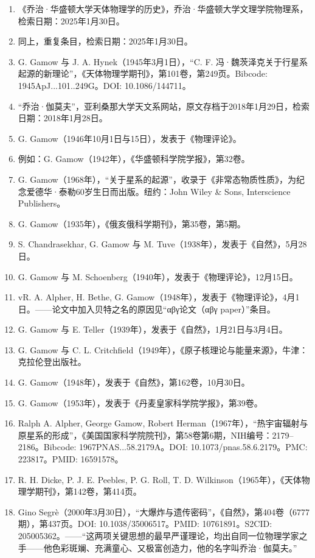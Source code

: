 \begin{enumerate}
\item 《乔治·华盛顿大学天体物理学的历史》，乔治·华盛顿大学文理学院物理系，检索日期：2025年1月30日。
\item 同上，重复条目，检索日期：2025年1月30日。
\item G. Gamow 与 J. A. Hynek（1945年3月1日），“C. F. 冯·魏茨泽克关于行星系起源的新理论”，《天体物理学期刊》，第101卷，第249页。Bibcode: 1945ApJ...101..249G。DOI: 10.1086/144711。
\item “乔治·伽莫夫”，亚利桑那大学天文系网站，原文存档于2018年1月29日，检索日期：2018年1月28日。
\item G. Gamow（1946年10月1日与15日），发表于《物理评论》。
\item 例如：G. Gamow（1942年），《华盛顿科学院学报》，第32卷。
\item G. Gamow（1968年），“关于星系的起源”，收录于《非常态物质性质》，为纪念爱德华·泰勒60岁生日而出版。纽约：John Wiley & Sons, Interscience Publishers。
\item G. Gamow（1935年），《俄亥俄科学期刊》，第35卷，第5期。
\item S. Chandrasekhar, G. Gamow 与 M. Tuve（1938年），发表于《自然》，5月28日。
\item G. Gamow 与 M. Schoenberg（1940年），发表于《物理评论》，12月15日。
\item vR. A. Alpher, H. Bethe, G. Gamow（1948年），发表于《物理评论》，4月1日。——论文中加入贝特之名的原因见“αβγ论文（αβγ paper）”条目。
\item G. Gamow 与 E. Teller（1939年），发表于《自然》，1月21日与3月4日。
\item G. Gamow 与 C. L. Critchfield（1949年），《原子核理论与能量来源》，牛津：克拉伦登出版社。
\item G. Gamow（1948年），发表于《自然》，第162卷，10月30日。
\item G. Gamow（1953年），发表于《丹麦皇家科学院学报》，第39卷。
\item Ralph A. Alpher, George Gamow, Robert Herman（1967年），“热宇宙辐射与原星系的形成”，《美国国家科学院院刊》，第58卷第6期，NIH编号：2179–2186。Bibcode: 1967PNAS...58.2179A。DOI: 10.1073/pnas.58.6.2179。PMC: 223817。PMID: 16591578。
\item R. H. Dicke, P. J. E. Peebles, P. G. Roll, T. D. Wilkinson（1965年），《天体物理学期刊》，第142卷，第414页。
\item Gino Segrè（2000年3月30日），“大爆炸与遗传密码”，《自然》，第404卷（6777期），第437页。DOI: 10.1038/35006517。PMID: 10761891。S2CID: 205005362。——“这两项关键思想的最早严谨理论，均出自同一位物理学家之手——他色彩斑斓、充满童心、又极富创造力，他的名字叫乔治·伽莫夫。”

\end{enumerate}
